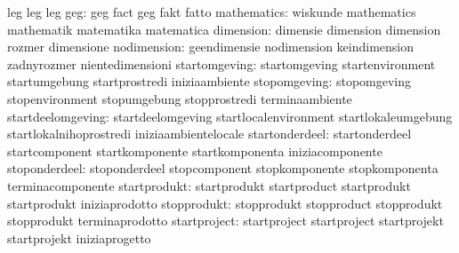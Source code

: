                                   leg                              leg
                                  leg
                             geg: geg                              fact
                                  geg                              fakt
                                  fatto
                     mathematics: wiskunde                         mathematics
                                  mathematik                       matematika
                                  matematica
                       dimension: dimensie                         dimension
                                  dimension                        rozmer
                                  dimensione
                     nodimension: geendimensie                     nodimension
                                  keindimension                    zadnyrozmer
                                  nientedimensioni
                   startomgeving: startomgeving                    startenvironment
                                  startumgebung                    startprostredi
                                  iniziaambiente
                    stopomgeving: stopomgeving                     stopenvironment
                                  stopumgebung                     stopprostredi
                                  terminaambiente
               startdeelomgeving: startdeelomgeving                startlocalenvironment
                                  startlokaleumgebung              startlokalnihoprostredi
                                  iniziaambientelocale
                  startonderdeel: startonderdeel                   startcomponent
                                  startkomponente                  startkomponenta
                                  iniziacomponente
                   stoponderdeel: stoponderdeel                    stopcomponent
                                  stopkomponente                   stopkomponenta
                                  terminacomponente
                    startprodukt: startprodukt                     startproduct
                                  startprodukt                     startprodukt
                                  iniziaprodotto
                     stopprodukt: stopprodukt                      stopproduct
                                  stopprodukt                      stopprodukt
                                  terminaprodotto
                    startproject: startproject                     startproject
                                  startprojekt                     startprojekt
                                  iniziaprogetto
